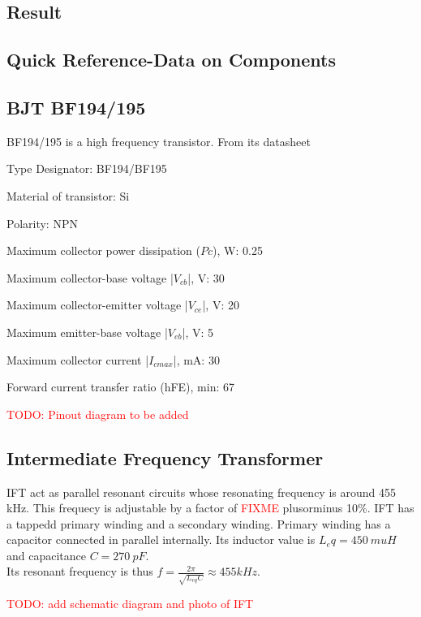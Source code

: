\documentclass{book}
\begin{document}
\section*{Result}
\begin{appendix}
\chapter {Quick Reference-Data on Components}
\section{BJT BF194/195}
\label{BF194/195}
BF194/195 is a high frequency transistor. From its datasheet 

Type Designator: BF194/BF195

Material of transistor: Si

Polarity: NPN

Maximum collector power dissipation ($Pc$), W: 0.25

Maximum collector-base voltage |$V_{cb}$|, V: 30

Maximum collector-emitter voltage |$V_{ce}$|, V: 20

Maximum emitter-base voltage |$V_{eb}$|, V: 5

Maximum collector current |$I_{c max}$|, mA: 30

Forward current transfer ratio (hFE), min: 67

\textcolor{red}{TODO: Pinout diagram to be added}

\section{Intermediate Frequency Transformer}
\label{IFT}
IFT act as parallel resonant circuits whose resonating frequency is around 455 kHz. This frequecy is adjustable by a factor of  \textcolor{red}{FIXME} plusorminus 10\%. IFT has a tappedd primary winding and a secondary winding. Primary winding has a capacitor connected in parallel internally. Its inductor value is $L_eq=450\ mu H$ and capacitance $C=270\ pF$. 
\\Its resonant frequency is thus $f=\frac{2\pi}{\sqrt{L_{eq}C}}\approx 455 kHz$.

\textcolor{red}{TODO: add schematic diagram and photo of IFT}
\end{appendix}
\begin{thebibliography}{1}

\end{thebibliography}
\end{document}
